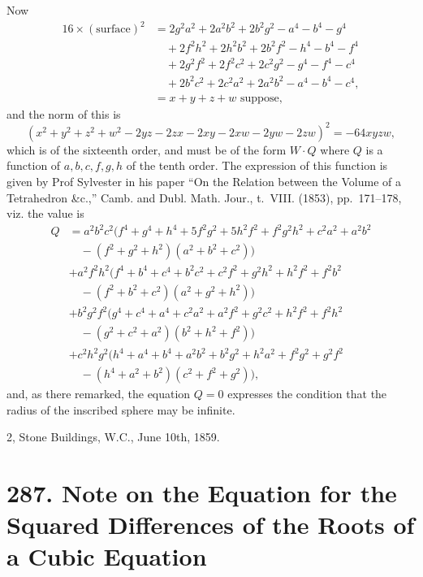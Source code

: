 \documentclass[11pt,a4paper]{article}
\theoremstyle{plain}
\begin{document}
Now
\begin{align*}
16 \times (\text{surface})^2 &= 2g^2a^2 + 2a^2b^2 + 2b^2g^2 - a^4 - b^4 - g^4\\
&\quad + 2f^2h^2 + 2h^2b^2 + 2b^2f^2 - h^4 - b^4 - f^4\\
&\quad + 2g^2f^2 + 2f^2c^2 + 2c^2g^2 - g^4 - f^4 - c^4\\
&\quad + 2b^2c^2 + 2c^2a^2 + 2a^2b^2 - a^4 - b^4 - c^4,\\
&= x + y + z + w\text{ suppose},
\end{align*}
and the norm of this is
\[
(x^2 + y^2 + z^2 + w^2 - 2yz - 2zx - 2xy - 2xw - 2yw - 2zw)^2 = -64xyzw,
\]
which is of the sixteenth order, and must be of the form $W \cdot Q$ where $Q$ is a function of $a, b, c, f, g, h$ of the tenth order. The expression of this function is given by Prof Sylvester in his paper ``On the Relation between the Volume of a Tetrahedron \&c.,'' Camb. and Dubl. Math. Jour., t.~VIII. (1853), pp.~171--178, viz. the value is
\begin{align*}
Q &= a^2b^2c^2(f^4 + g^4 + h^4 + 5f^2g^2 + 5h^2f^2 + f^2g^2h^2 + c^2a^2 + a^2b^2\\
&\quad - (f^2 + g^2 + h^2)(a^2 + b^2 + c^2))\\
&+ a^2f^2h^2(f^4 + b^4 + c^4 + b^2c^2 + c^2f^2 + g^2h^2 + h^2f^2 + f^2b^2\\
&\quad - (f^2 + b^2 + c^2)(a^2 + g^2 + h^2))\\
&+ b^2g^2f^2(g^4 + c^4 + a^4 + c^2a^2 + a^2f^2 + g^2c^2 + h^2f^2 + f^2h^2\\
&\quad - (g^2 + c^2 + a^2)(b^2 + h^2 + f^2))\\
&+ c^2h^2g^2(h^4 + a^4 + b^4 + a^2b^2 + b^2g^2 + h^2a^2 + f^2g^2 + g^2f^2\\
&\quad - (h^4 + a^2 + b^2)(c^2 + f^2 + g^2)),
\end{align*}
and, as there remarked, the equation $Q = 0$ expresses the condition that the radius of the inscribed sphere may be infinite.

\hfill 2, Stone Buildings, W.C., June 10th, 1859.


\newpage
\section*{287. Note on the Equation for the Squared Differences of the Roots of a Cubic Equation}
\label{sec:287}
\end{document}
